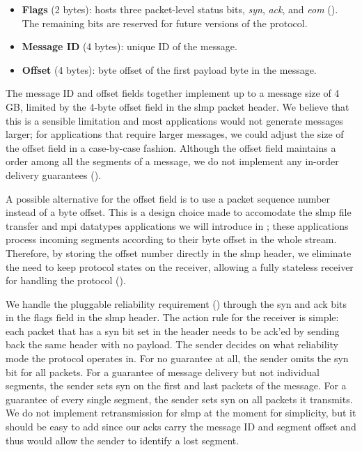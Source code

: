 \begin{itemize}
    \item \textbf{Flags} (2 bytes): hosts three packet-level status bits, \emph{\ac{syn}}, \emph{\ac{ack}}, and \emph{\ac{eom}} ().  The remaining bits are reserved for future versions of the protocol.
    \item \textbf{Message ID} (4 bytes): unique ID of the message.
    \item \textbf{Offset} (4 bytes): byte offset of the first payload byte in the message.
\end{itemize}
The message ID and offset fields together implement  up to a message size of 4 GB, limited by the 4-byte offset field in the \ac{slmp} packet header.  We believe that this is a sensible limitation and most applications would not generate messages larger; for applications that require larger messages, we could adjust the size of the offset field in a case-by-case fashion.  Although the offset field maintains a order among all the segments of a message, we do not implement any in-order delivery guarantees ().

A possible alternative for the offset field is to use a packet sequence number instead of a byte offset.  This is a design choice made to accomodate the \ac{slmp} file transfer and \ac{mpi} datatypes applications we will introduce in ; these applications process incoming segments according to their byte offset in the whole stream.   Therefore, by storing the offset number directly in the \ac{slmp} header, we eliminate the need to keep protocol states on the receiver, allowing a fully stateless receiver for handling the protocol ().

We handle the pluggable reliability requirement () through the \ac{syn} and \ac{ack} bits in the flags field in the \ac{slmp} header.  The action rule for the receiver is simple: each packet that has a \ac{syn} bit set in the header needs to be \ac{ack}'ed by sending back the same header with no payload.  The sender decides on what reliability mode the protocol operates in.  For no guarantee at all, the sender omits the \ac{syn} bit for all packets.  For a guarantee of message delivery but not individual segments, the sender sets \ac{syn} on the first and last packets of the message.  For a guarantee of every single segment, the sender sets \ac{syn} on all packets it transmits.  We do not implement retransmission for \ac{slmp} at the moment for simplicity, but it should be easy to add since our \ac{ack}s carry the message ID and segment offset and thus would allow the sender to identify a lost segment.

